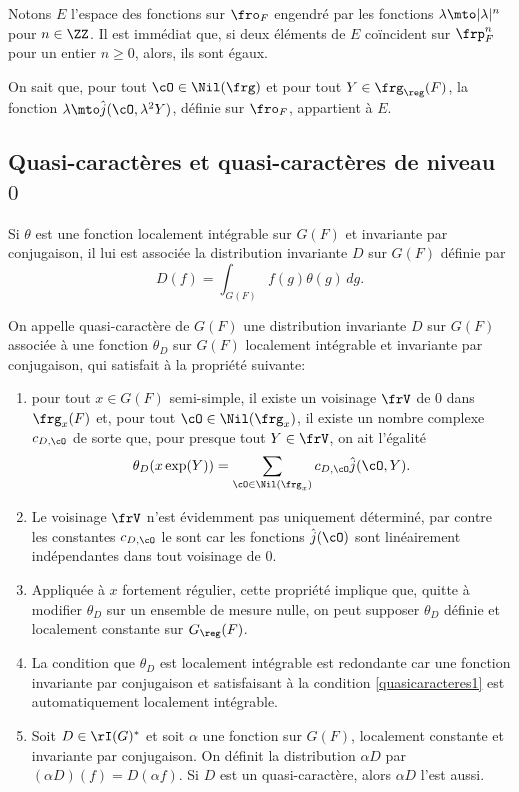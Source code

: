 Notons $E$ l'espace des fonctions sur $\fro_{F}$ engendré par les fonctions $\lambda\mto \vert \lambda\vert ^n$ pour $n\in \ZZ$. Il est immédiat que, si deux éléments de $E$ coïncident sur $\frp_{F}^n$ pour un entier $n\geq0$, alors, ils sont égaux.

On sait que, pour tout $\cO\in \Nil(\frg)$ et pour tout $Y\in \frg_{\reg}(F)$, la fonction $\lambda\mto \hat{j}(\cO,\lambda^2 Y)$, définie sur $\fro_{F}$, appartient à $E$.

\subsection{Quasi-caractères et quasi-caractères de niveau~\texorpdfstring{$0$}{0}}\label{quasicaracteres}

Si $\theta$ est une fonction localement intégrable sur $G(F)$ et invariante par conjugaison, il lui est associée la distribution invariante $D$ sur $G(F)$ définie par
\[
D(f)=\int_{G(F)}f(g)\theta(g)\,dg.
\]

On appelle quasi-caractère de $G(F)$ une distribution invariante $D$ sur $G(F)$ associée à une fonction $\theta_{D}$ sur $G(F)$ localement intégrable et invariante par conjugaison, qui satisfait à la propriété suivante:
\begin{enumerate}
\item\label{quasicaracteres1}
pour tout $x\in G(F)$ semi-simple, il existe un voisinage $\frV$ de $0$ dans $\frg_{x}(F)$ et, pour tout $\cO\in \Nil(\frg_{x})$, il existe un nombre complexe $c_{D,\cO}$ de sorte que, pour presque tout $Y\in \frV$, on ait l'égalité
\[
\theta_{D}(x \exp(Y))=\sum_{\cO\in \Nil(\frg_{x})}c_{D,\cO}\hat{j}(\cO,Y).
\]
\end{enumerate}

\skpt
\begin{rems*}
\begin{enumerate}\setcounter{enumi}{1}
\item\label{quasicaracteres2}
Le voisinage $\frV$ n'est évidemment pas uniquement déterminé, par contre les constantes $c_{D,\cO}$ le sont car les fonctions $\hat{j}(\cO)$ sont linéairement indépendantes dans tout voisinage de $0$.

\item\label{quasicaracteres3}
Appliquée à $x$ fortement régulier, cette propriété implique que, quitte à modifier $\theta_{D}$ sur un ensemble de mesure nulle, on peut supposer $\theta_{D}$ définie et localement constante sur $G_{\reg}(F)$.

\item\label{quasicaracteres4}
La condition que $\theta_{D}$ est localement intégrable est redondante car une fonction invariante par conjugaison et satisfaisant à la condition \eqref{quasicaracteres1} est automatiquement localement intégrable.

\item\label{quasicaracteres5}
Soit $D\in \rI(G)^*$ et soit $\alpha$ une fonction sur $G(F)$, localement constante et invariante par conjugaison. On définit la distribution $\alpha D$ par $(\alpha D)(f)=D(\alpha f)$. Si $D$ est un quasi-caractère, alors $\alpha D$ l'est aussi.
\end{enumerate}
\end{rems*}

